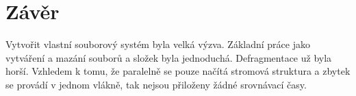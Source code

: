 \documentclass{report}
\begin{document}
\chapter*{Závěr}
Vytvořit vlastní souborový systém byla velká výzva. Základní práce jako vytváření a mazání souborů a složek byla jednoduchá. Defragmentace už byla horší. Vzhledem k tomu, že paralelně se pouze načítá stromová struktura a zbytek se provádí v jednom vlákně, tak nejsou přiloženy žádné srovnávací časy.
\end{document}
